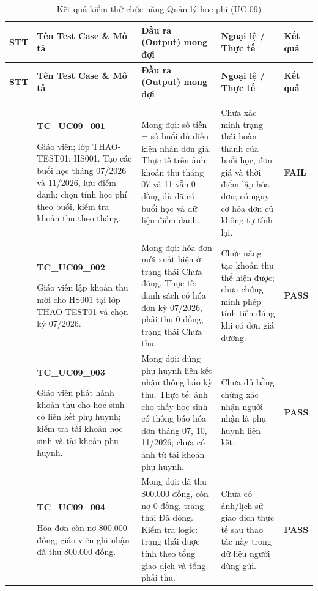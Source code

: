 \vspace{0.4em}
\begin{longtable}{|>{\centering\arraybackslash}p{0.8cm}|>{\raggedright\arraybackslash}p{4.6cm}|>{\raggedright\arraybackslash}p{3.8cm}|>{\raggedright\arraybackslash}p{3.8cm}|>{\centering\arraybackslash}p{1.5cm}|}
\caption{Kết quả kiểm thử chức năng Quản lý học phí (UC-09)}\label{tab:test-uc09}\\
\hline
\textbf{STT} & \textbf{Tên Test Case \& Mô tả} & \textbf{Đầu ra (Output) mong đợi} & \textbf{Ngoại lệ / Thực tế} & \textbf{Kết quả} \\ \hline
\endfirsthead
\hline
\textbf{STT} & \textbf{Tên Test Case \& Mô tả} & \textbf{Đầu ra (Output) mong đợi} & \textbf{Ngoại lệ / Thực tế} & \textbf{Kết quả} \\ \hline
\endhead
\hline \multicolumn{5}{r}{\scriptsize\itshape Xem tiếp ở trang sau} \\
\endfoot
\hline
\endlastfoot
1 & \textbf{TC\_UC09\_001}\par Giáo viên; lớp THAO-TEST01; HS001. Tạo các buổi học tháng 07/2026 và 11/2026, lưu điểm danh; chọn tính học phí theo buổi, kiểm tra khoản thu theo tháng. & Mong đợi: số tiền = số buổi đủ điều kiện nhân đơn giá. Thực tế trên ảnh: khoản thu tháng 07 và 11 vẫn 0 đồng dù đã có buổi học và dữ liệu điểm danh. & Chưa xác minh trạng thái hoàn thành của buổi học, đơn giá và thời điểm lập hóa đơn; có nguy cơ hóa đơn cũ không tự tính lại. & \textbf{FAIL} \\ \hline
2 & \textbf{TC\_UC09\_002}\par Giáo viên lập khoản thu mới cho HS001 tại lớp THAO-TEST01 và chọn kỳ 07/2026. & Mong đợi: hóa đơn mới xuất hiện ở trạng thái Chưa đóng. Thực tế: danh sách có hóa đơn kỳ 07/2026, phải thu 0 đồng, trạng thái Chưa thu. & Chức năng tạo khoản thu thể hiện được; chưa chứng minh phép tính tiền đúng khi có đơn giá dương. & \textbf{PASS} \\ \hline
3 & \textbf{TC\_UC09\_003}\par Giáo viên phát hành khoản thu cho học sinh có liên kết phụ huynh; kiểm tra tài khoản học sinh và tài khoản phụ huynh. & Mong đợi: đúng phụ huynh liên kết nhận thông báo kỳ thu. Thực tế: ảnh cho thấy học sinh có thông báo hóa đơn tháng 07, 10, 11/2026; chưa có ảnh từ tài khoản phụ huynh. & Chưa đủ bằng chứng xác nhận người nhận là phụ huynh liên kết. & \textbf{PASS} \\ \hline
4 & \textbf{TC\_UC09\_004}\par Hóa đơn còn nợ 800.000 đồng; giáo viên ghi nhận đã thu 800.000 đồng. & Mong đợi: đã thu 800.000 đồng, còn nợ 0 đồng, trạng thái Đã đóng. Kiểm tra logic: trạng thái được tính theo tổng giao dịch và tổng phải thu. & Chưa có ảnh/lịch sử giao dịch thực tế sau thao tác này trong dữ liệu người dùng gửi. & \textbf{PASS} \\ \hline

\end{longtable}
